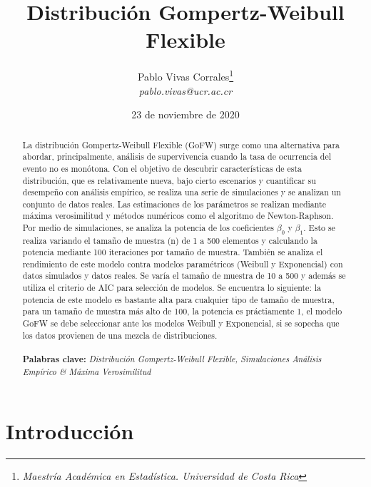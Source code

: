 \documentclass[12pt,a4paper]{article}
\author{Pablo Vivas Corrales\footnote{\textit{Maestría Académica en Estadística. Universidad de Costa Rica}}\\\textit{pablo.vivas@ucr.ac.cr}}
\title{Distribución Gompertz-Weibull Flexible}
\date{23 de noviembre de 2020}
\begin{document}
\maketitle
\begin{abstract}
\noindent
La distribución Gompertz-Weibull Flexible (GoFW) surge como una alternativa para abordar, principalmente, análisis de supervivencia cuando la tasa de ocurrencia del evento no es monótona. Con el objetivo de descubrir características de esta distribución, que es relativamente nueva, bajo cierto escenarios y cuantificar su desempeño con análisis empírico, se realiza una serie de simulaciones y se analizan un conjunto de datos reales. Las estimaciones de los parámetros se realizan mediante máxima verosimilitud y métodos numéricos como el algoritmo de Newton-Raphson. Por medio de simulaciones, se analiza la potencia de los coeficientes $\beta_0$ y $\beta_1$. Esto se realiza variando el tamaño de muestra (n) de 1 a 500 elementos y calculando la potencia mediante 100 iteraciones por tamaño de muestra. También se analiza  el rendimiento de este modelo contra modelos paramétricos (Weibull y Exponencial) con datos simulados y datos reales. Se varía el tamaño de muestra de 10 a 500 y además se utiliza el criterio de AIC para selección de modelos. Se encuentra lo siguiente: la potencia de este modelo es bastante alta para cualquier tipo de tamaño de muestra, para un tamaño de muestra más alto de 100, la potencia es práctiamente 1, el modelo GoFW se debe seleccionar ante los modelos Weibull y Exponencial, si se sopecha que los datos provienen de una mezcla de distribuciones. \\
\\
\textbf{Palabras clave:} \textit{Distribución Gompertz-Weibull Flexible, Simulaciones Análisis Empírico \& Máxima Verosimilitud} 
\end{abstract}

\section{Introducción}
\end{document}
